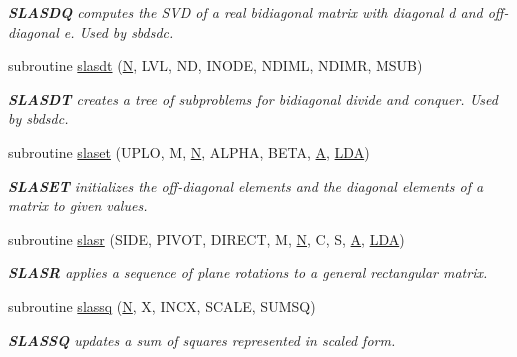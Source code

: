 \begin{DoxyCompactItemize}
\begin{DoxyCompactList}\small\item\em {\bfseries S\+L\+A\+S\+D\+Q} computes the S\+V\+D of a real bidiagonal matrix with diagonal d and off-\/diagonal e. Used by sbdsdc. \end{DoxyCompactList}\item 
subroutine \hyperlink{group__auxOTHERauxiliary_gae747f83ac11f2283d1d3f8b09d7a1138}{slasdt} (\hyperlink{polmisc_8c_a0240ac851181b84ac374872dc5434ee4}{N}, L\+V\+L, N\+D, I\+N\+O\+D\+E, N\+D\+I\+M\+L, N\+D\+I\+M\+R, M\+S\+U\+B)
\begin{DoxyCompactList}\small\item\em {\bfseries S\+L\+A\+S\+D\+T} creates a tree of subproblems for bidiagonal divide and conquer. Used by sbdsdc. \end{DoxyCompactList}\item 
subroutine \hyperlink{group__auxOTHERauxiliary_ga6174184453f17ad7cc3488044325d5ac}{slaset} (U\+P\+L\+O, M, \hyperlink{polmisc_8c_a0240ac851181b84ac374872dc5434ee4}{N}, A\+L\+P\+H\+A, B\+E\+T\+A, \hyperlink{classA}{A}, \hyperlink{example__user_8c_ae946da542ce0db94dced19b2ecefd1aa}{L\+D\+A})
\begin{DoxyCompactList}\small\item\em {\bfseries S\+L\+A\+S\+E\+T} initializes the off-\/diagonal elements and the diagonal elements of a matrix to given values. \end{DoxyCompactList}\item 
subroutine \hyperlink{group__auxOTHERauxiliary_ga60f6d566e3a36c43835b0ff3055879dc}{slasr} (S\+I\+D\+E, P\+I\+V\+O\+T, D\+I\+R\+E\+C\+T, M, \hyperlink{polmisc_8c_a0240ac851181b84ac374872dc5434ee4}{N}, C, S, \hyperlink{classA}{A}, \hyperlink{example__user_8c_ae946da542ce0db94dced19b2ecefd1aa}{L\+D\+A})
\begin{DoxyCompactList}\small\item\em {\bfseries S\+L\+A\+S\+R} applies a sequence of plane rotations to a general rectangular matrix. \end{DoxyCompactList}\item 
subroutine \hyperlink{group__auxOTHERauxiliary_gaf079526ad6de4de7424528ec61b52629}{slassq} (\hyperlink{polmisc_8c_a0240ac851181b84ac374872dc5434ee4}{N}, X, I\+N\+C\+X, S\+C\+A\+L\+E, S\+U\+M\+S\+Q)
\begin{DoxyCompactList}\small\item\em {\bfseries S\+L\+A\+S\+S\+Q} updates a sum of squares represented in scaled form. \end{DoxyCompactList}\item 

\end{DoxyCompactItemize}
